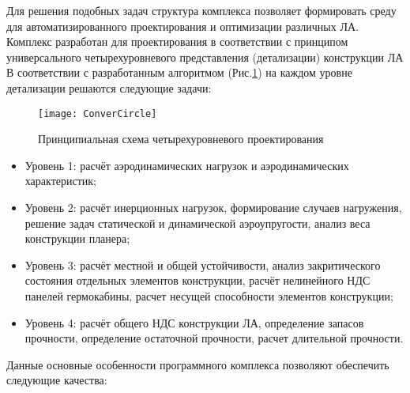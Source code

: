 \label{sec:Conver}


Для решения подобных задач структура комплекса позволяет формировать среду для автоматизированного проектирования и оптимизации различных ЛА. Комплекс разработан для проектирования в соответствии с принципом универсального четырехуровневого представления (детализации) конструкции ЛА В соответствии с разработанным алгоритмом (Рис.\ref{fig:ConverCircle}) на каждом уровне детализации решаются следующие задачи:




\begin{figure}[ht]
\centering
\texttt{[image: ConverCircle]} 
\caption{Принципиальная схема четырехуровневого проектирования}
\label{fig:ConverCircle}
\end{figure}



\begin{itemize}
\item Уровень 1: расчёт аэродинамических нагрузок и аэродинамических характеристик; 
\item Уровень 2: расчёт инерционных нагрузок, формирование случаев нагружения, решение задач статической и динамической аэроупругости, анализ веса конструкции планера;
\item Уровень 3: расчёт местной и общей устойчивости, анализ закритического состояния отдельных элементов конструкции, расчёт нелинейного НДС панелей гермокабины, расчет несущей способности элементов конструкции;
\item Уровень 4: расчёт общего НДС конструкции ЛА, определение запасов прочности, определение остаточной прочности, расчет длительной прочности.
\end{itemize}

Данные основные особенности программного комплекса позволяют обеспечить следующие качества:

